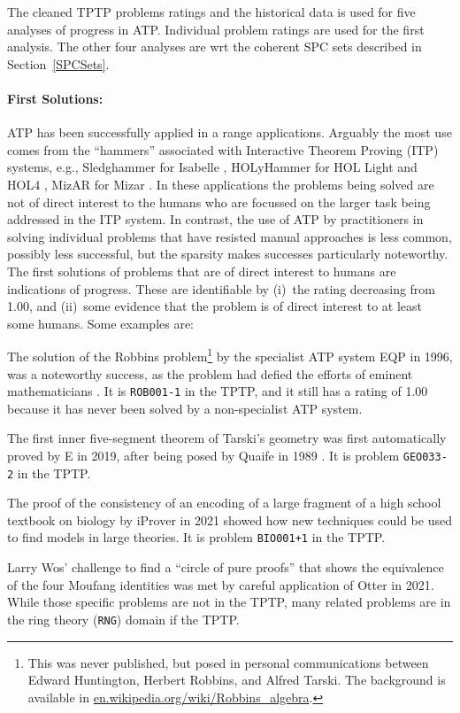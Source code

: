 \documentclass[runningheads]{llncs}
\newenvironment{packed_itemize}{
\vspace*{-0.5em}
\begin{itemize}
\setlength{\partopsep}{0pt}
\setlength{\itemsep}{1pt}
\setlength{\parskip}{0pt}
\setlength{\parsep}{0pt}
}{\end{itemize}}
\begin{document}
The cleaned TPTP problems ratings and the historical data is used for five analyses of progress
in ATP.
Individual problem ratings are used for the first analysis.
The other four analyses are wrt the coherent SPC sets described in Section~\ref{SPCSets}.

\paragraph{First Solutions:}
ATP has been successfully applied in a range applications.
Arguably the most use comes from the ``hammers'' \cite{BK+16} associated with Interactive 
Theorem Proving (ITP) systems, e.g., Sledghammer \cite{PB10} for Isabelle \cite{NPW02}, 
HOLyHammer \cite{KU14} for HOL Light \cite{Har09} and HOL4 \cite{SN08}, 
MizAR \cite{KU15-M40} for Mizar \cite{GKN10}.
In these applications the problems being solved are not of direct interest to the humans
who are focussed on the larger task being addressed in the ITP system.
In contrast, the use of ATP by practitioners in solving individual problems that have resisted
manual approaches is less common, possibly less successful, but the sparsity makes successes 
particularly noteworthy. 
The first solutions of problems that are of direct interest to humans are indications of progress.
These are identifiable by (i)~the rating decreasing from 1.00, and (ii)~some evidence that the 
problem is of direct interest to at least some humans.
Some examples are:
\begin{packed_itemize}
\item The solution of the Robbins problem\footnote{%
      This was never published, but posed in personal communications between Edward Huntington,
      Herbert Robbins, and Alfred Tarski.
      The background is available in 
      \href{https://en.wikipedia.org/wiki/Robbins_algebra}{en.wikipedia.org/wiki/Robbins\_algebra}.}
      by the specialist ATP system EQP \cite{McC97} 
      in 1996, was a noteworthy success, as the problem had defied the efforts of eminent 
      mathematicians \cite{HMT71}.
      It is {\tt ROB001-1} in the TPTP, and it still has a rating of 1.00 because it has never 
      been solved by a non-specialist ATP system.
\item The first inner five-segment theorem of Tarski's geometry \cite{SST83} was first 
      automatically proved by E \cite{Sch13-LPAR} in 2019, after being posed by Quaife in 
      1989 \cite{Qua89}.
      It is problem {\tt GEO033-2} in the TPTP.
\item The proof of the consistency of an encoding of a large fragment of a high school textbook
      on biology \cite{CDI13} by iProver \cite{Kor08} in 2021 showed how new techniques could
      be used to find models in large theories.
      It is problem {\tt BIO001+1} in the TPTP.
\item Larry Wos' challenge to find a ``circle of pure proofs'' that shows the equivalence
      of the four Moufang identities \cite{Wos19} was met by careful application \cite{Ver22} of
      Otter \cite{McC03-Otter} in 2021.
      While those specific problems are not in the TPTP, many related problems are in the
      ring theory ({\tt RNG}) domain if the TPTP.
\end{packed_itemize}
\end{document}
